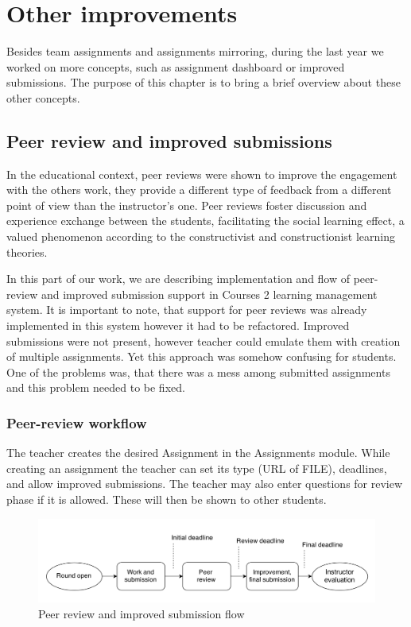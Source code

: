 \chapter{Other improvements}

Besides team assignments and assignments mirroring, during the last year we worked on more concepts, such as assignment dashboard or improved submissions. The purpose of this chapter is to bring a brief overview about these other concepts.

\section{Peer review and improved submissions}

In the educational context, peer reviews were shown to improve the engagement with the others work, they provide a different type of feedback from a different point of view than the instructor’s one. Peer reviews foster discussion and experience exchange between the students, facilitating the social learning effect, a valued phenomenon according to the constructivist and constructionist learning theories. \cite{peerreview}


In this part of our work, we are describing implementation and flow of peer-review and improved submission support in Courses 2 learning management system. It is important to note, that support for peer reviews was already implemented in this system however it had to be refactored. Improved submissions were not present, however teacher could emulate them with creation of multiple assignments. Yet this approach was somehow confusing for students. One of the problems was, that there was a mess among submitted assignments and this problem needed to be fixed.


\subsection{Peer-review workflow}

The teacher creates the desired Assignment in the Assignments module. While creating an assignment the teacher can set its type (URL of FILE), deadlines, and allow improved submissions. The teacher may also enter questions for review phase if it is allowed. These will then be shown to other students.

\begin{figure}[h]
    \centering
    \includegraphics[width=\textwidth]{images/peerreview.png}
    \caption{Peer review and improved submission flow}
    \label{fig:improved_submissions}
\end{figure}

